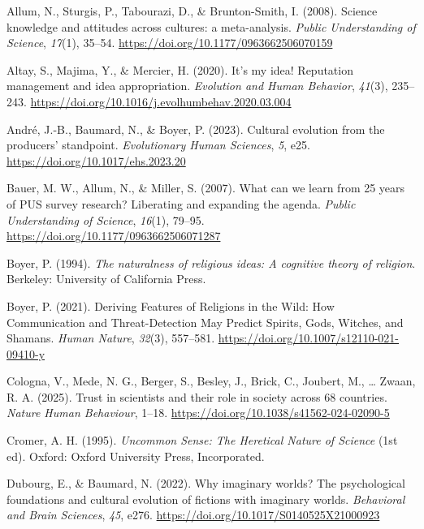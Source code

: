 \documentclass[
  english,
  doc,floatsintext]{apa6}
\newlength{\cslhangindent}
\newenvironment{CSLReferences}[2] %
 {\begin{list}{}{%
  \setlength{\itemindent}{0pt}
  \setlength{\leftmargin}{0pt}
  \setlength{\parsep}{0pt}
  \ifodd #1
   \setlength{\leftmargin}{\cslhangindent}
   \setlength{\itemindent}{-1\cslhangindent}
  \fi
  \setlength{\itemsep}{#2\baselineskip}}}
 {\end{list}}
\begin{document}
\label{refs}
\begin{CSLReferences}{1}{0}
Allum, N., Sturgis, P., Tabourazi, D., \& Brunton-Smith, I. (2008). Science knowledge and attitudes across cultures: a meta-analysis. \emph{Public Understanding of Science}, \emph{17}(1), 35--54. \url{https://doi.org/10.1177/0963662506070159}

Altay, S., Majima, Y., \& Mercier, H. (2020). It's my idea! Reputation management and idea appropriation. \emph{Evolution and Human Behavior}, \emph{41}(3), 235--243. \url{https://doi.org/10.1016/j.evolhumbehav.2020.03.004}

André, J.-B., Baumard, N., \& Boyer, P. (2023). Cultural evolution from the producers{'} standpoint. \emph{Evolutionary Human Sciences}, \emph{5}, e25. \url{https://doi.org/10.1017/ehs.2023.20}

Bauer, M. W., Allum, N., \& Miller, S. (2007). What can we learn from 25 years of PUS survey research? Liberating and expanding the agenda. \emph{Public Understanding of Science}, \emph{16}(1), 79--95. \url{https://doi.org/10.1177/0963662506071287}

Boyer, P. (1994). \emph{The naturalness of religious ideas: A cognitive theory of religion}. Berkeley: University of California Press.

Boyer, P. (2021). Deriving Features of Religions in the Wild: How Communication and Threat-Detection May Predict Spirits, Gods, Witches, and Shamans. \emph{Human Nature}, \emph{32}(3), 557--581. \url{https://doi.org/10.1007/s12110-021-09410-y}

Cologna, V., Mede, N. G., Berger, S., Besley, J., Brick, C., Joubert, M., \ldots{} Zwaan, R. A. (2025). Trust in scientists and their role in society across 68 countries. \emph{Nature Human Behaviour}, 1--18. \url{https://doi.org/10.1038/s41562-024-02090-5}

Cromer, A. H. (1995). \emph{Uncommon Sense: The Heretical Nature of Science} (1st ed). Oxford: Oxford University Press, Incorporated.

Dubourg, E., \& Baumard, N. (2022). Why imaginary worlds? The psychological foundations and cultural evolution of fictions with imaginary worlds. \emph{Behavioral and Brain Sciences}, \emph{45}, e276. \url{https://doi.org/10.1017/S0140525X21000923}


\end{CSLReferences}
\end{document}

